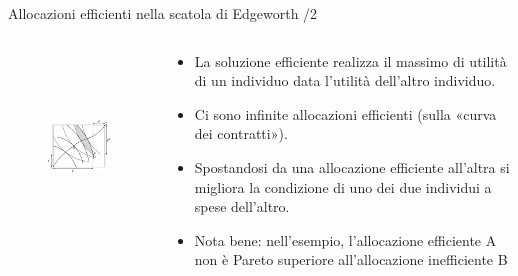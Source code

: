 \documentclass[aspectratio=149,11pt]{beamer}
\begin{document}
\begin{frame}{Allocazioni efficienti nella scatola di Edgeworth /2}
\begin{columns}
\begin{column}{.5\columnwidth}
\begin{figure}
\centering
\includegraphics[height=5cm]{./figure/edgeworth-1.pdf}
\end{figure}
\end{column}

\begin{column}{.5\columnwidth}
\begin{itemize}
\item La soluzione efficiente realizza il massimo di utilità di un individuo data l’utilità dell’altro individuo.
\item Ci sono infinite allocazioni efficienti (sulla «curva dei contratti»).
\item Spostandosi da una allocazione efficiente all’altra si migliora la condizione di uno dei due individui a spese dell’altro.
\item Nota bene: nell’esempio, l’allocazione efficiente A non è Pareto superiore all’allocazione inefficiente B
\end{itemize}
\end{column}
\end{columns}
\end{frame}
\end{document}
